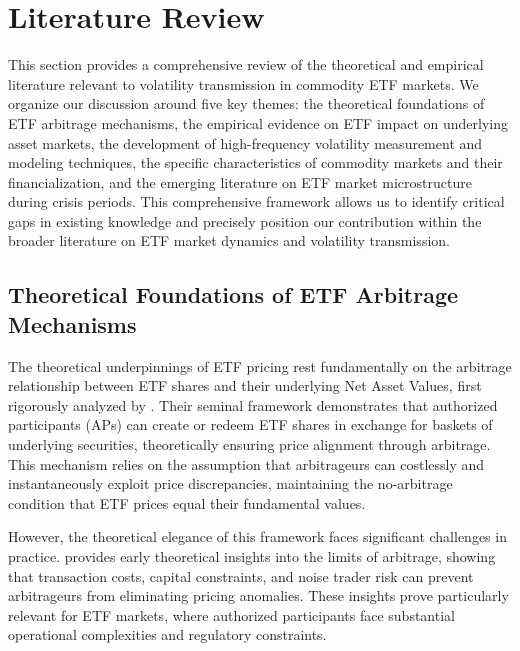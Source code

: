 
\section{Literature Review} \label{sec:literature}

This section provides a comprehensive review of the theoretical and empirical literature relevant to volatility transmission in commodity ETF markets. We organize our discussion around five key themes: the theoretical foundations of ETF arbitrage mechanisms, the empirical evidence on ETF impact on underlying asset markets, the development of high-frequency volatility measurement and modeling techniques, the specific characteristics of commodity markets and their financialization, and the emerging literature on ETF market microstructure during crisis periods. This comprehensive framework allows us to identify critical gaps in existing knowledge and precisely position our contribution within the broader literature on ETF market dynamics and volatility transmission.

\subsection{Theoretical Foundations of ETF Arbitrage Mechanisms}

The theoretical underpinnings of ETF pricing rest fundamentally on the arbitrage relationship between ETF shares and their underlying Net Asset Values, first rigorously analyzed by \citet{ackert2000arbitrage}. Their seminal framework demonstrates that authorized participants (APs) can create or redeem ETF shares in exchange for baskets of underlying securities, theoretically ensuring price alignment through arbitrage. This mechanism relies on the assumption that arbitrageurs can costlessly and instantaneously exploit price discrepancies, maintaining the no-arbitrage condition that ETF prices equal their fundamental values.

However, the theoretical elegance of this framework faces significant challenges in practice. \citet{pontiff1996costly} provides early theoretical insights into the limits of arbitrage, showing that transaction costs, capital constraints, and noise trader risk can prevent arbitrageurs from eliminating pricing anomalies. These insights prove particularly relevant for ETF markets, where authorized participants face substantial operational complexities and regulatory constraints.

